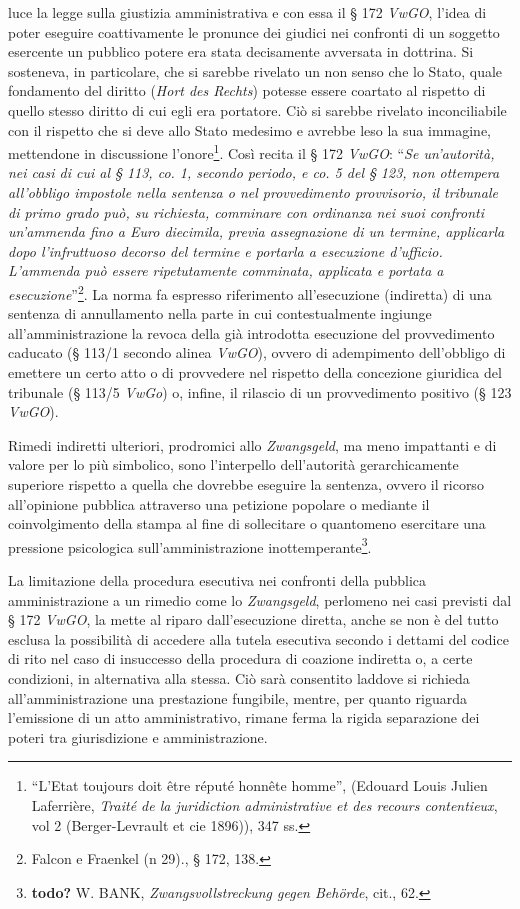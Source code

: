 \documentclass[12pt,it,a4paper,]{report}
\begin{document}
luce la legge sulla giustizia amministrativa e con essa il § 172
\emph{VwGO}, l'idea di poter eseguire coattivamente le pronunce dei
giudici nei confronti di un soggetto esercente un pubblico potere era
stata decisamente avversata in dottrina. Si sosteneva, in particolare,
che si sarebbe rivelato un non senso che lo Stato, quale fondamento del
diritto (\emph{Hort des Rechts}) potesse essere coartato al rispetto di
quello stesso diritto di cui egli era portatore. Ciò si sarebbe rivelato
inconciliabile con il rispetto che si deve allo Stato medesimo e avrebbe
leso la sua immagine, mettendone in discussione l'onore\footnote{``L'Etat
  toujours doit être réputé honnête homme'', (Edouard Louis Julien
  Laferrière, \emph{Traité de la juridiction administrative et des
  recours contentieux}, vol 2 (Berger-Levrault et cie 1896)), 347 ss.}.
Così recita il § 172 \emph{VwGO}: ``\emph{Se un'autorità, nei casi di
cui al § 113, co. 1, secondo periodo, e co. 5 del § 123, non ottempera
all'obbligo impostole nella sentenza o nel provvedimento provvisorio, il
tribunale di primo grado può, su richiesta, comminare con ordinanza nei
suoi confronti un'ammenda fino a Euro diecimila, previa assegnazione di
un termine, applicarla dopo l'infruttuoso decorso del termine e portarla
a esecuzione d'ufficio. L'ammenda può essere ripetutamente comminata,
applicata e portata a esecuzione}''\footnote{{Falcon e Fraenkel (n
  29).}, § 172, 138.}. La norma fa espresso riferimento all'esecuzione
(indiretta) di una sentenza di annullamento nella parte in cui
contestualmente ingiunge all'amministrazione la revoca della già
introdotta esecuzione del provvedimento caducato (§ 113/1 secondo alinea
\emph{VwGO}), ovvero di adempimento dell'obbligo di emettere un certo
atto o di provvedere nel rispetto della concezione giuridica del
tribunale (§ 113/5 \emph{VwGo}) o, infine, il rilascio di un
provvedimento positivo (§ 123 \emph{VwGO}).

Rimedi indiretti ulteriori, prodromici allo \emph{Zwangsgeld}, ma meno
impattanti e di valore per lo più simbolico, sono l'interpello
dell'autorità gerarchicamente superiore rispetto a quella che dovrebbe
eseguire la sentenza, ovvero il ricorso all'opinione pubblica attraverso
una petizione popolare o mediante il coinvolgimento della stampa al fine
di sollecitare o quantomeno esercitare una pressione psicologica
sull'amministrazione inottemperante\footnote{\textbf{todo?} W. BANK,
  \emph{Zwangsvollstreckung gegen Behörde}, cit., 62.}.

La limitazione della procedura esecutiva nei confronti della pubblica
amministrazione a un rimedio come lo \emph{Zwangsgeld}, perlomeno nei
casi previsti dal § 172 \emph{VwGO}, la mette al riparo dall'esecuzione
diretta, anche se non è del tutto esclusa la possibilità di accedere
alla tutela esecutiva secondo i dettami del codice di rito nel caso di
insuccesso della procedura di coazione indiretta o, a certe condizioni,
in alternativa alla stessa. Ciò sarà consentito laddove si richieda
all'amministrazione una prestazione fungibile, mentre, per quanto
riguarda l'emissione di un atto amministrativo, rimane ferma la rigida
separazione dei poteri tra giurisdizione e amministrazione.
\end{document}
